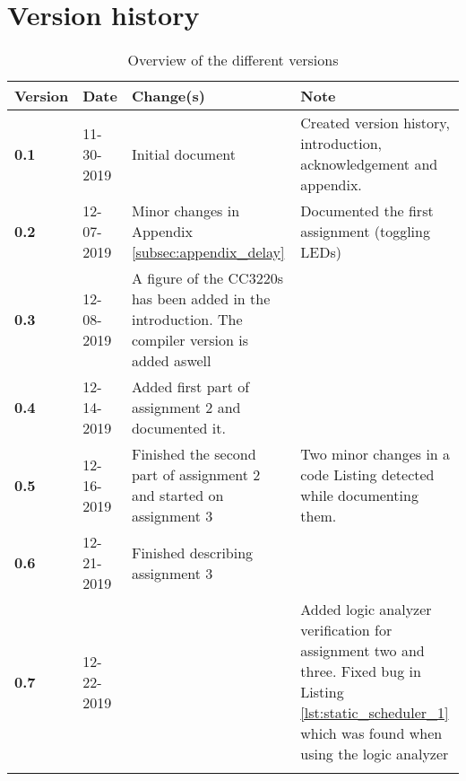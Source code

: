 \section*{Version history}


\begin{longtable}{| p{} | p{} | p{} | p{} |}

    \hline
    \textcolor{darkpink}{Version} & \textcolor{darkpink}{Date} & \textcolor{darkpink}{Change(s)} & \textcolor{darkpink}{Note} \\
     
    \hline
    \textbf{0.1} & 11-30-2019 & Initial document & Created version history, introduction, acknowledgement and appendix. \\

    \hline

    \textbf{0.2} & 12-07-2019 & Minor changes in Appendix \ref{subsec:appendix_delay} & Documented the first assignment (toggling LEDs) \\

    \hline

    \textbf{0.3} & 12-08-2019 & A figure of the CC3220s has been added in the introduction. The compiler version is added aswell & \\
    \hline

    \textbf{0.4} & 12-14-2019 & Added first part of assignment 2 and documented it. & \\

    \hline

    \textbf{0.5} & 12-16-2019 & Finished the second part of assignment 2 and started on assignment 3 & Two minor changes in a code Listing detected while documenting them. \\

    \hline

    \textbf{0.6} & 12-21-2019 & Finished describing assignment 3 &\\

    \hline

    \textbf{0.7} & 12-22-2019 & & Added logic analyzer verification for assignment two and three. Fixed bug in Listing \ref{lst:static_scheduler_1} which was found when using the logic analyzer \\

    \hline

    \caption{Overview of the different versions}
    \label{tab:version}

\end{longtable}

